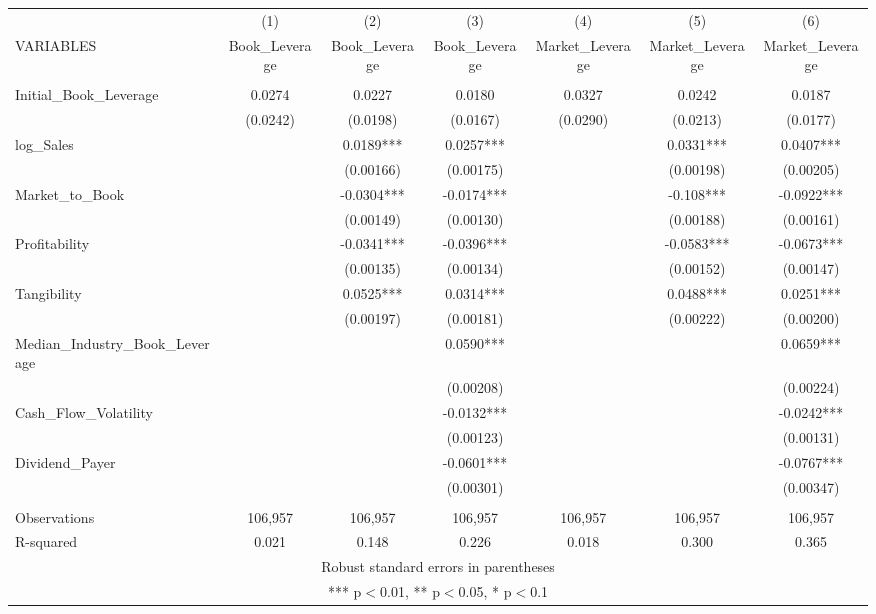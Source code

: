 \begin{tabular}{lcccccc} \hline
 & (1) & (2) & (3) & (4) & (5) & (6) \\
VARIABLES & Book\_Leverage & Book\_Leverage & Book\_Leverage & Market\_Leverage & Market\_Leverage & Market\_Leverage \\ \hline
 &  &  &  &  &  &  \\
Initial\_Book\_Leverage & 0.0274 & 0.0227 & 0.0180 & 0.0327 & 0.0242 & 0.0187 \\
 & (0.0242) & (0.0198) & (0.0167) & (0.0290) & (0.0213) & (0.0177) \\
log\_Sales &  & 0.0189*** & 0.0257*** &  & 0.0331*** & 0.0407*** \\
 &  & (0.00166) & (0.00175) &  & (0.00198) & (0.00205) \\
Market\_to\_Book &  & -0.0304*** & -0.0174*** &  & -0.108*** & -0.0922*** \\
 &  & (0.00149) & (0.00130) &  & (0.00188) & (0.00161) \\
Profitability &  & -0.0341*** & -0.0396*** &  & -0.0583*** & -0.0673*** \\
 &  & (0.00135) & (0.00134) &  & (0.00152) & (0.00147) \\
Tangibility &  & 0.0525*** & 0.0314*** &  & 0.0488*** & 0.0251*** \\
 &  & (0.00197) & (0.00181) &  & (0.00222) & (0.00200) \\
Median\_Industry\_Book\_Leverage &  &  & 0.0590*** &  &  & 0.0659*** \\
 &  &  & (0.00208) &  &  & (0.00224) \\
Cash\_Flow\_Volatility &  &  & -0.0132*** &  &  & -0.0242*** \\
 &  &  & (0.00123) &  &  & (0.00131) \\
Dividend\_Payer &  &  & -0.0601*** &  &  & -0.0767*** \\
 &  &  & (0.00301) &  &  & (0.00347) \\
 &  &  &  &  &  &  \\
Observations & 106,957 & 106,957 & 106,957 & 106,957 & 106,957 & 106,957 \\
 R-squared & 0.021 & 0.148 & 0.226 & 0.018 & 0.300 & 0.365 \\ \hline
\multicolumn{7}{c}{ Robust standard errors in parentheses} \\
\multicolumn{7}{c}{ *** p$<$0.01, ** p$<$0.05, * p$<$0.1} \\
\end{tabular}
